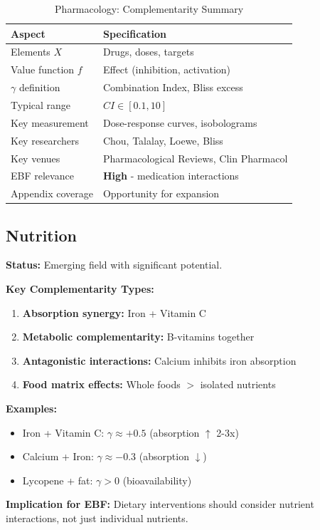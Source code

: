 \begin{table}[h]
\centering
\caption{Pharmacology: Complementarity Summary}
\label{tab:pharma-summary}
\renewcommand{\arraystretch}{1.3}
\small
\begin{tabular}{@{}ll@{}}
\toprule
\textbf{Aspect} & \textbf{Specification} \\
\midrule
Elements $X$ & Drugs, doses, targets \\
Value function $f$ & Effect (inhibition, activation) \\
$\gamma$ definition & Combination Index, Bliss excess \\
Typical range & $CI \in [0.1, 10]$ \\
Key measurement & Dose-response curves, isobolograms \\
Key researchers & Chou, Talalay, Loewe, Bliss \\
Key venues & Pharmacological Reviews, Clin Pharmacol \\
EBF relevance & \textbf{High} - medication interactions \\
Appendix coverage & Opportunity for expansion \\
\bottomrule
\end{tabular}
\end{table}

\subsection{Nutrition}
\label{sec:nutrition}

\begin{tcolorbox}[colback=lime!5!white,colframe=lime!75!black,title=\textbf{Nutrition: Nutrient Interactions}]

\textbf{Status:} Emerging field with significant potential.

\textbf{Key Complementarity Types:}
\begin{enumerate}[noitemsep]
    \item \textbf{Absorption synergy:} Iron + Vitamin C
    \item \textbf{Metabolic complementarity:} B-vitamins together
    \item \textbf{Antagonistic interactions:} Calcium inhibits iron absorption
    \item \textbf{Food matrix effects:} Whole foods $>$ isolated nutrients
\end{enumerate}

\textbf{Examples:}
\begin{itemize}[noitemsep]
    \item Iron + Vitamin C: $\gamma \approx +0.5$ (absorption $\uparrow$ 2-3x)
    \item Calcium + Iron: $\gamma \approx -0.3$ (absorption $\downarrow$)
    \item Lycopene + fat: $\gamma > 0$ (bioavailability)
\end{itemize}

\textbf{Implication for EBF:}
Dietary interventions should consider nutrient interactions, not just individual nutrients.

\end{tcolorbox}

